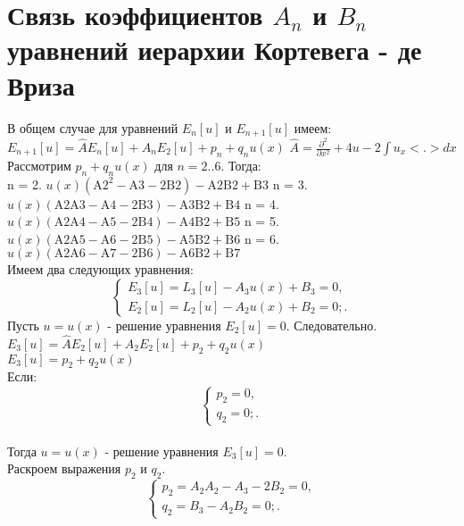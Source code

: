 \documentclass[14pt,a4paper]{article}
\begin{document}
\section{Связь коэффициентов $A_n$ и $B_n$ уравнений иерархии Кортевега - де Вриза}
В общем случае для уравнений $E_{n} [u] $ и $E_{n + 1} [u]$ имеем: \\
$E_{n + 1} [u] = \widehat{A} E_n [u] + A_n E_2 [u] + p_n + q_n u(x)$
\newline
$\widehat{A} = \frac{\partial^2}{\partial x^2} + 4u - 2 \int u_{x} <.> dx$
\newline
Рассмотрим $p_n + q_n u(x)$ для $n = 2..6$. Тогда:\\
n = 2. $u(x) \left(\text{A2}^2-\text{A3}-2 \text{B2}\right)-\text{A2} \text{B2}+\text{B3}$
\newline
n = 3. $u(x) (\text{A2} \text{A3}-\text{A4}-2 \text{B3})-\text{A3} \text{B2}+\text{B4}$
\newline
n = 4. $u(x) (\text{A2} \text{A4}-\text{A5}-2 \text{B4})-\text{A4} \text{B2}+\text{B5}$
\newline
n = 5. $u(x) (\text{A2} \text{A5}-\text{A6}-2 \text{B5})-\text{A5} \text{B2}+\text{B6}$
\newline
n = 6. $u(x) (\text{A2} \text{A6}-\text{A7}-2 \text{B6})-\text{A6} \text{B2}+\text{B7}$
\\
Имеем два следующих уравнения:\\
\begin{equation*}
\begin{cases}
E_3 [u] = L_3 [u] - A_3 u(x) + B_3 = 0, \\
E_2 [u] = L_2 [u] - A_2 u(x) + B_2 = 0;.
\end{cases}
\end{equation*}
Пусть $u = u(x)$ - решение уравнения $E_2 [u] = 0$. Следовательно.\\
$E_3[u] = \widehat{A}E_2 [u] +A_2 E_2 [u] + p_2 + q_2 u(x)$ \\
$E_3[u] = p_2 + q_2 u(x)$ \\
Если:
\begin{equation*}
\begin{cases}
p_2 = 0, \\
q_2 = 0;.
\end{cases}
\end{equation*} \\
Тогда $u = u(x)$ - решение уравнения $E_3 [u] = 0$. \\
Раскроем выражения $p_2$ и $q_2$.\\
\begin{equation*}
\begin{cases}
p_2 = A_2 A_2 - A_3 - 2B_2 = 0, \\
q_2 = B_3 - A_2 B_2 = 0;.
\end{cases}
\end{equation*}
\end{document}
